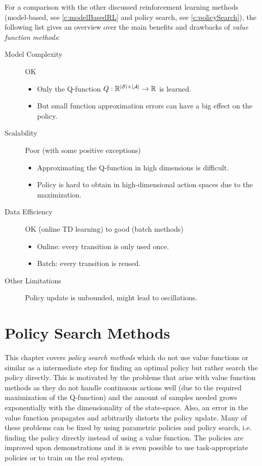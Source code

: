 		For a comparison with the other discussed reinforcement learning methods (model-based, see \autoref{c:modelBasedRL} and policy search, see \autoref{c:policySearch}), the following list gives an overview over the main benefits and drawbacks of \emph{value function methods}:
		\begin{description}
			\item[Model Complexity] OK
				\begin{itemize}
					\item Only the Q-function \( Q : \mathbb{R}^{\lvert \mathcal{S} \rvert + \lvert \mathcal{A} \rvert} \to \mathbb{R} \) is learned.
					\item But small function approximation errors can have a big effect on the policy.
				\end{itemize}
			\item[Scalability] Poor (with some positive exceptions)
				\begin{itemize}
					\item Approximating the Q-function in high dimensions is difficult.
					\item Policy is hard to obtain in high-dimensional action spaces due to the maximization.
				\end{itemize}
			\item[Data Efficiency] OK (online TD learning) to good (batch methods)
				\begin{itemize}
					\item Online: every transition is only used once.
					\item Batch: every transition is reused.
				\end{itemize}
			\item[Other Limitations] Policy update is unbounded, might lead to oscillations.
		\end{description}

\chapter{Policy Search Methods}
	\label{c:policySearch}

	This chapter covers \emph{policy search methods} which do not use value functions or similar as a intermediate step for finding an optimal policy but rather search the policy directly. This is motivated by the problems that arise with value function methods as they do not handle continuous actions well (due to the required maximization of the Q-function) and the amount of samples needed grows exponentially with the dimensionality of the state-space. Also, an error in the value function propagates and arbitrarily distorts the policy update. Many of these problems can be fixed by using parametric policies and policy search, i.e. finding the policy directly instead of using a value function. The policies are improved upon demonstrations and it is even possible to use task-appropriate policies or to train on the real system.

